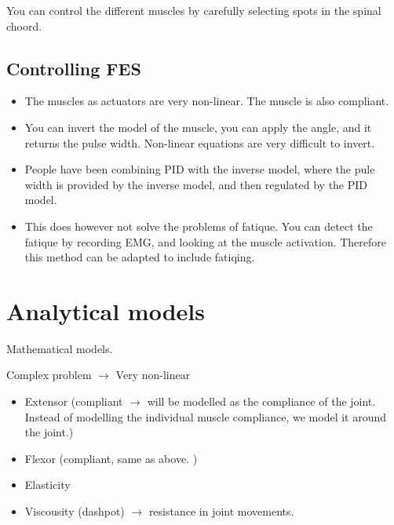 \documentclass[a4paper]{article}
\begin{document}
You can control the different muscles by carefully selecting spots in the spinal choord.


\subsection{Controlling FES}
\begin{itemize}
	\item The muscles as actuators are very non-linear. The muscle is also compliant.
	\item You can invert the model of the muscle, you can apply the angle, and it returns the pulse width. Non-linear equations are very difficult to invert. 
	\item People have been combining PID with the inverse model, where the pule width is provided by the inverse model, and then regulated by the PID model.
	\item This does however not solve the problems of fatique. You can detect the fatique by recording EMG, and looking at the muscle activation. Therefore this method can be adapted to include fatiqing. 
\end{itemize}


\section{Analytical models}
Mathematical models. 

Complex problem $ \rightarrow $ Very non-linear

\begin{itemize}
	\item Extensor (compliant $ \rightarrow $ will be modelled as the compliance of the joint. Instead of modelling the individual muscle compliance, we model it around the joint.)
	\item Flexor (compliant, same as above. )
	\item Elasticity
	\item Viscousity (dashpot) $ \rightarrow $ resistance in joint movements. 
\end{itemize}
\end{document}
